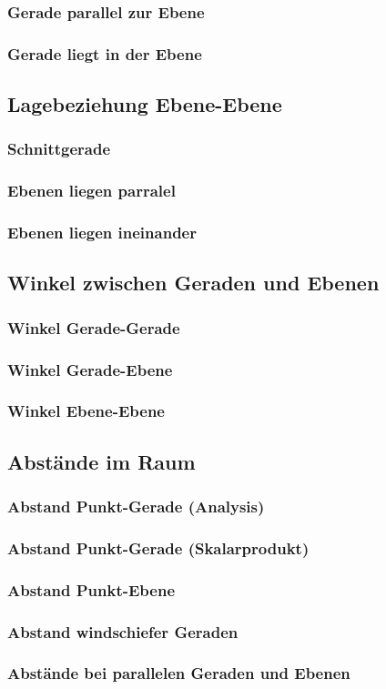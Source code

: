 \subsubsection{Gerade parallel zur Ebene}
\subsubsection{Gerade liegt in der Ebene}
\subsection{Lagebeziehung Ebene-Ebene}
\subsubsection{Schnittgerade}
\subsubsection{Ebenen liegen parralel}
\subsubsection{Ebenen liegen ineinander}
\subsection{Winkel zwischen Geraden und Ebenen}
\subsubsection{Winkel Gerade-Gerade}
\subsubsection{Winkel Gerade-Ebene}
\subsubsection{Winkel Ebene-Ebene}

\subsection{Abstände im Raum}
\subsubsection{Abstand Punkt-Gerade (Analysis)}
\subsubsection{Abstand Punkt-Gerade (Skalarprodukt)}
\subsubsection{Abstand Punkt-Ebene}
\subsubsection{Abstand windschiefer Geraden}
\subsubsection{Abstände bei parallelen Geraden und Ebenen}








